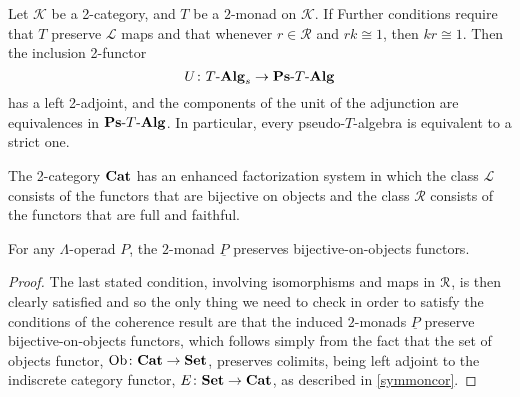 
\begin{thm}\label{thm:power}
Let $\mathcal{K}$ be a 2-category, and $T$ be a $2$-monad on $\mathcal{K}$. If 
Further conditions require that $T$ preserve $\mathcal{L}$ maps and that whenever $r \in \mathcal{R}$ and $rk \cong 1$, then $kr \cong 1$. 
Then the inclusion 2-functor  \[
        U \colon T\mbox{-}\mathbf{Alg}_s \rightarrow \mathbf{Ps}\mbox{-}T\mbox{-}\mathbf{Alg}
    \]
has a left 2-adjoint, and the components of the unit of the adjunction are equivalences in $\mathbf{Ps}\mbox{-}T\mbox{-}\mathbf{Alg}$. In particular, every pseudo-$T$-algebra is equivalent to a strict one.
\end{thm}

\begin{lem}\label{lem:efs-cat}
The 2-category $\mathbf{Cat}$ has an enhanced factorization system in which the class $\mathcal{L}$ consists of the functors that are bijective on objects and the class $\mathcal{R}$ consists of the functors that are full and faithful.
\end{lem}


\begin{prop}
For any $\Lambda$-operad $P$, the $2$-monad $\underline{P}$ preserves bijective-on-objects functors.
\end{prop}
\begin{proof}
The last stated condition, involving isomorphisms and maps in $\mathcal{R}$, is then clearly satisfied and so the only thing we need to check in order to satisfy the conditions of the coherence result are that the induced $2$-monads $\underline{P}$ preserve bijective-on-objects functors, which follows simply from the fact that the set of objects functor, $\operatorname{Ob} \colon \mathbf{Cat} \rightarrow \mathbf{Set}$, preserves colimits, being left adjoint to the indiscrete category functor, $E \colon \mathbf{Set} \rightarrow \mathbf{Cat}$, as described in \cref{symmoncor}.
\end{proof}

